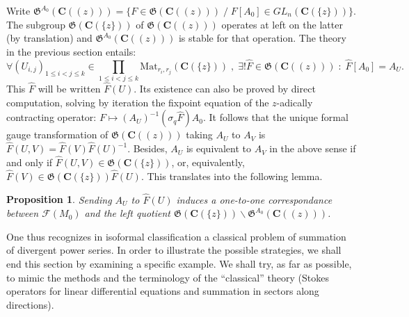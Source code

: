 \documentclass[english]{smfart}
\newtheorem{prop}[thm]{Proposition}
\numberwithin{equation}{thm}
\def\sq{\sigma_q}
\def\C{{\mathbf C}}
\def\F{{\mathcal{F}}}
\def\Ma{{\text{Mat}}}
\def\G{{\mathfrak{G}}}
\def\Ka{{\C(\{z\})}}
\def\Kf{{\C((z))}}
\def\l{\left}
\def\r{\right}
\begin{document}
Write
$\G^{A_{0}}(\Kf) = \{F \in \G(\Kf) \;/\; F[A_{0}] \in GL_{n}(\Ka) \}$.
The subgroup $\G(\Ka)$ of $\G(\Kf)$ operates at left on the latter
(by translation) and $\G^{A_{0}}(\Kf)$ is stable for that operation. 
The theory in the previous section entails:
$$
\forall (U_{i,j})_{1 \leq i < j \leq k} \in 
\prod_{1 \leq i < j \leq k} \Ma_{r_{i},r_{j}}(\Ka) \;,\;
\exists ! \hat{F} \in \G(\Kf) \;:\;
\hat{F} [A_{0}] = A_{U}.
$$
This $\hat{F}$ will be written $\hat{F}(U)$. Its existence can also
be proved by direct computation, solving by iteration the fixpoint
equation of the $z$-adically contracting operator: 
$F \mapsto \l(A_{U}\r)^{-1} \l(\sq \hat{F}\r) A_{0}$.
It follows that the unique formal gauge transformation of $\G(\Kf)$
taking $A_{U}$ to $A_{V}$ is $\hat{F}(U,V) = \hat{F}(V) \hat{F}(U)^{-1}$.
Besides, $A_{U}$ is equivalent to $A_{V}$ in the above sense
if and only if $\hat{F}(U,V) \in \G(\Ka)$, or, equivalently,
$\hat{F}(V) \in \G(\Ka) \hat{F}(U)$. 
This translates into the following lemma.

\begin{prop} \label{prop:formel-modulo-convergent}
Sending $A_{U}$ to $\hat{F}(U)$ induces a one-to-one correspondance 
between $\F(M_{0})$ and the
left quotient $\G(\Ka) \backslash \G^{A_{0}}(\Kf)$.
\end{prop}


One thus recognizes
in isoformal classification a classical problem of summation of 
divergent power series. In order to illustrate the possible strategies,
we shall end this section by examining a specific example. We shall try, 
as far as possible, to mimic the methods and the terminology of the 
``classical'' theory (Stokes operators for linear differential equations 
and summation in sectors along directions).
\end{document}
